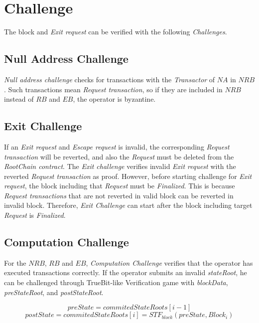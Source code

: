 \documentclass[letterpaper, 11pt]{article}
\begin{document}
\section{Challenge}
\begin{CJK}{UTF8}{mj}
The block and \emph{Exit request} can be verified with the following \emph{Challenges}.

\subsection{Null Address Challenge}
\begin{CJK}{UTF8}{mj}
\emph{Null address challenge} checks for transactions with the \emph{Transactor} of $NA$ in $NRB$. Such transactions mean \emph{Request transaction}, so if they are included in $NRB$ instead of $RB$ and $EB$, the operator is byzantine.
\end{CJK}

\subsection{Exit Challenge}
\begin{CJK}{UTF8}{mj}
If an \emph{Exit request} and \emph{Escape request} is invalid, the corresponding \emph{Request transaction} will be reverted, and also the \emph{Request} must be deleted from the \emph{RootChain contract}. The \emph{Exit challenge} verifies invalid \emph{Exit request} with the reverted \emph{Request transaction} as proof. However, before starting challenge for \emph{Exit request}, the block including that \emph{Request} must be \emph{Finalized}. This is because \emph{Request transactions} that are not reverted in valid block can be reverted in invalid block. Therefore, \emph{Exit Challenge} can start after the block including target \emph{Request} is \emph{Finalized}.
\end{CJK}

\subsection{Computation Challenge}
\begin{CJK}{UTF8}{mj}
For the $NRB$, $RB$ and $EB$, \emph{Computation Challenge} verifies that the operator has executed transactions correctly. If the operator submits an invalid \emph{stateRoot}, he can be challenged through TrueBit-like Verification game with \emph{blockData}, \emph{preStateRoot}, and \emph{postStateRoot}.

$$preState = commitedStateRoots[i-1]$$
$$postState = commitedStateRoots[i] = STF_{block}(preState, Block_i)$$


\end{CJK}
\end{CJK}
\end{document}
